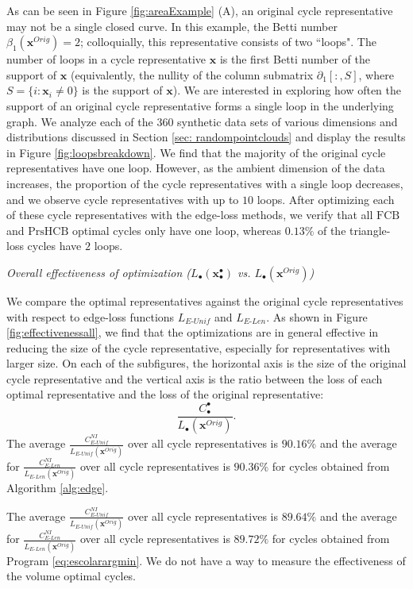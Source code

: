 \documentclass[utf8]{formatting_stuff/frontiersFPHY}
\newcommand{\originalrep}{\mathbf{x}^{Orig}}
\newcommand{\optimalrep}{\mathbf{x}}
\newcommand{\se}{Section }
\newcommand{\fig}{Figure }
\newcommand{\NI}{^{NI}}
\newcommand{\setoffilteredcyclebases}{\mathrm{FCB}}
\newcommand{\setofpersistenthcyclebases}{\mathrm{PrsHCB}}
\newcommand{\EU}{_{E\text{-}Unif}}
\newcommand{\EL}{_{E\text{-}Len}}
\theoremstyle{plain}
\theoremstyle{definition}
\begin{document}
As can be seen in \fig \ref{fig:areaExample} (A), an original cycle representative may not be a single closed curve. In this example, the Betti number $\beta_1(\originalrep)=2$; colloquially, this representative consists of two ``loops". The number of loops in a cycle representative $\optimalrep$ is the first Betti number of the support of $\optimalrep$ (equivalently, the nullity of the column submatrix $\partial_1[:, S]$, where $S = \{i : \optimalrep_i \neq 0\}$ is the support of $\optimalrep$). We are interested in exploring how often the support of an original cycle representative forms a single loop in the underlying graph. We analyze each of the 360 synthetic data sets of various dimensions and distributions discussed in \se \ref{sec: randompointclouds} and display the results in \fig \ref{fig:loopsbreakdown}. We find that the majority of the original cycle representatives have one loop. However, as the ambient dimension of the data increases, the proportion of the cycle representatives with a single loop decreases, and we observe cycle representatives with up to $10$ loops. After optimizing each of these cycle representatives with the edge-loss methods, we verify that all $\setoffilteredcyclebases$ and $\setofpersistenthcyclebases$ optimal cycles only have one loop, whereas $0.13\%$ of the triangle-loss cycles have $2$ loops.  


\noindent \emph{Overall effectiveness of optimization ($L_\bullet(\optimalrep_\bullet^\bullet)$ vs. $L_\bullet(\originalrep)$)} 

We compare the optimal representatives against the original cycle representatives with respect to edge-loss functions $L\EU$ and $L\EL$. As shown in \fig \ref{fig:effectivenessall}, we find that the optimizations are in general effective in reducing the size of the cycle representative, especially for representatives with larger size. On each of the subfigures, the horizontal axis is the size of the original cycle representative and the vertical axis is the ratio between the loss of each optimal representative and the loss of the original representative:
$$\frac{C^\bullet_\bullet}{L_\bullet(\originalrep)}.$$ 
The average $\frac{C\NI\EU}{L\EU(\originalrep)}$ over all cycle representatives is $90.16\%$ and the average for $\frac{C\NI\EL}{L\EL(\originalrep)}$ over all cycle representatives is $90.36\%$ for cycles obtained from Algorithm \ref{alg:edge}.

The average $\frac{C\NI\EU}{L\EU(\originalrep)}$ over all cycle representatives is $89.64\%$ and the average for $\frac{C\NI\EL}{L\EL(\originalrep)}$ over all cycle representatives is $89.72\%$ for cycles obtained from Program \eqref{eq:escolarargmin}. We do not have a way to measure the effectiveness of the volume optimal cycles.  
\end{document}
